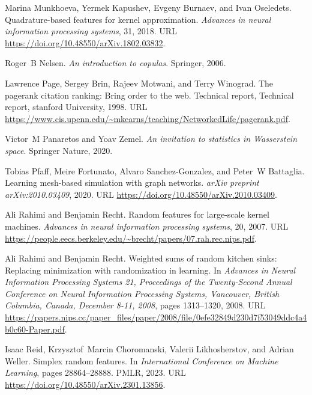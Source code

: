 \begin{thebibliography}{76}
Marina Munkhoeva, Yermek Kapushev, Evgeny Burnaev, and Ivan Oseledets.
\newblock Quadrature-based features for kernel approximation.
\newblock \emph{Advances in neural information processing systems}, 31, 2018.
\newblock URL \url{https://doi.org/10.48550/arXiv.1802.03832}.

Roger~B Nelsen.
\newblock \emph{An introduction to copulas}.
\newblock Springer, 2006.

Lawrence Page, Sergey Brin, Rajeev Motwani, and Terry Winograd.
\newblock The pagerank citation ranking: Bring order to the web.
\newblock Technical report, Technical report, stanford University, 1998.
\newblock URL \url{https://www.cis.upenn.edu/~mkearns/teaching/NetworkedLife/pagerank.pdf}.

Victor~M Panaretos and Yoav Zemel.
\newblock \emph{An invitation to statistics in Wasserstein space}.
\newblock Springer Nature, 2020.

Tobias Pfaff, Meire Fortunato, Alvaro Sanchez-Gonzalez, and Peter~W Battaglia.
\newblock Learning mesh-based simulation with graph networks.
\newblock \emph{arXiv preprint arXiv:2010.03409}, 2020.
\newblock URL \url{https://doi.org/10.48550/arXiv.2010.03409}.

Ali Rahimi and Benjamin Recht.
\newblock Random features for large-scale kernel machines.
\newblock \emph{Advances in neural information processing systems}, 20, 2007.
\newblock URL \url{https://people.eecs.berkeley.edu/~brecht/papers/07.rah.rec.nips.pdf}.

Ali Rahimi and Benjamin Recht.
\newblock Weighted sums of random kitchen sinks: Replacing minimization with randomization in learning.
\newblock In \emph{Advances in Neural Information Processing Systems 21, Proceedings of the Twenty-Second Annual Conference on Neural Information Processing Systems, Vancouver, British Columbia, Canada, December 8-11, 2008}, pages 1313--1320, 2008.
\newblock URL \url{https://papers.nips.cc/paper_files/paper/2008/file/0efe32849d230d7f53049ddc4a4b0c60-Paper.pdf}.

Isaac Reid, Krzysztof~Marcin Choromanski, Valerii Likhosherstov, and Adrian Weller.
\newblock Simplex random features.
\newblock In \emph{International Conference on Machine Learning}, pages 28864--28888. PMLR, 2023.
\newblock URL \url{https://doi.org/10.48550/arXiv.2301.13856}.


\end{thebibliography}
